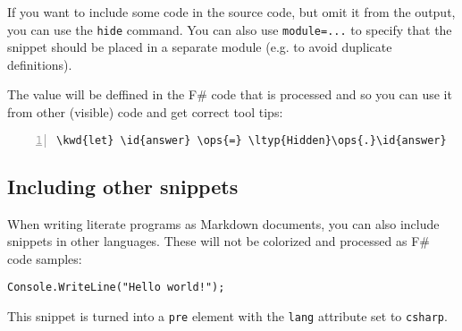 \documentclass{article}
\newcommand{\id}[1]{\textcolor[HTML]{000000}{#1}}
\newcommand{\kwd}[1]{\textcolor[HTML]{0000FF}{#1}}
\newcommand{\ops}[1]{\textcolor[HTML]{000000}{#1}}
\newcommand{\ltyp}[1]{\textcolor[HTML]{2B91AF}{#1}}
\begin{document}
If you want to include some code in the source code, 
but omit it from the output, you can use the \texttt{hide} 
command. You can also use \texttt{module=...} to specify that 
the snippet should be placed in a separate module 
(e.g. to avoid duplicate definitions).


The value will be deffined in the F\# code that is 
processed and so you can use it from other (visible) 
code and get correct tool tips:
\begin{Verbatim}[commandchars=\\\{\}, numbers=left]
\kwd{let} \id{answer} \ops{=} \ltyp{Hidden}\ops{.}\id{answer}

\end{Verbatim}

\subsection*{Including other snippets}



When writing literate programs as Markdown documents, 
you can also include snippets in other languages. 
These will not be colorized and processed as F\# 
code samples:
\begin{lstlisting}
Console.WriteLine("Hello world!");

\end{lstlisting}


This snippet is turned into a \texttt{pre} element with the
\texttt{lang} attribute set to \texttt{csharp}.
\end{document}

